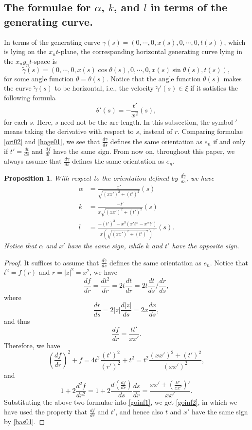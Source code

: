 \documentclass[12pt]{amsart}
\newtheorem{prop}[thm]{\sc Proposition}
\theoremstyle{definition}\newtheorem{exa}[thm]{\sc Example}
\theoremstyle{definition}\newtheorem{de}[thm]{\sc Definition}
\theoremstyle{definition}\newtheorem{rem}[thm]{\sc Remark}
\theoremstyle{definition}\newtheorem{prob}[thm]{\it Problem}
\theoremstyle{definition}\newtheorem{fact}[thm]{\sc Fact}
\theoremstyle{definition}\newtheorem{claim}[thm]{\sc Claim}
\numberwithin{equation}{section}
\begin{document}
\subsection{The formulae for $\alpha$, $k$, and $l$ in terms of the generating curve.}
In terms of the generating curve $\gamma(s)=(0,\cdots,0,x(s),0,\cdots,0,t(s))$, which is lying on the $x_{n}t$-plane, the corresponding horizontal generating curve lying in the $x_{n}y_{n}t$-space is
\begin{equation}\label{hoge01}
\tilde{\gamma}(s)=(0,\cdots,0,x(s)\cos{\theta(s)},0,\cdots,0,x(s)\sin{\theta(s)},t(s)),
\end{equation}
for some angle function $\theta=\theta(s)$. Notice that the angle function $\theta(s)$ makes the curve $\tilde{\gamma}(s)$ to be horizontal, i.e., the velocity $\tilde{\gamma}'(s)\in\xi$ if it satisfies the following formula 
\begin{equation}\label{foang}
\theta'(s)=-\frac{t'}{x^2}(s),
\end{equation}
for each $s$. Here, $s$ need not be the arc-length. In this subsection, the symbol $'$ means taking the derivative with respect to $s$, instead of $r$. Comparing formulae \eqref{ori02} and \eqref{hoge01}, we see that $\frac{d\tilde{\gamma}}{ds}$ defines the same orientation as $e_{n}$ if and only if $t'=\frac{dt}{ds}$ and $\frac{df}{dr}$ have the same sign. From now on, throughout this paper, we always assume that $\frac{d\tilde{\gamma}}{ds}$ defines the same orientation as $e_{n}$.
\begin{prop}
With respect to the orientation defined by
$\frac{d\tilde{\gamma}}{ds}$, we have
\begin{equation}\label{goinf2}
\begin{split}
\alpha&=\frac{x'}{\sqrt{(xx')^2+(t')^2}}(s)\\
k&=\frac{-t'}{x\sqrt{(xx')^2+(t')^2}}(s)\\  
l&=\frac{-(t')^3-x^3(x't''-x''t')}{x(\sqrt{(xx')^2+(t')^2})^3}(s).
\end{split}
\end{equation}
Notice that $\alpha$ and $x'$ have the same sign, while $k$ and $t'$ have the opposite sign.
\end{prop}
\begin{proof}
It suffices to assume that $\frac{d\tilde{\gamma}}{ds}$ defines the same orientation as $e_{n}$.
Notice that $t^{2}=f(r)$ and $ r=|z|^{2}=x^{2}$, we have 
\[\frac{df}{dr}=\frac{dt^2}{dr}=2t\frac{dt}{dr}=2t\frac{dt}{ds}/\frac{dr}{ds},\]
where \[\frac{dr}{ds}=2|z|\frac{d|z|}{ds}=2x\frac{dx}{ds},\] and thus 
\begin{equation}\label{bas01}
\frac{df}{dr}=\frac{tt'}{xx'}.
\end{equation}
Therefore, we have
\[(\frac{df}{dr})^2+f=4t^{2}\frac{(t')^2}{(r')^2}+t^2=t^{2}\frac{(xx')^2+(t')^2}{(xx')^2},\] and 
\[1+2\frac{d^2f}{dr^2}=1+2\frac{d(\frac{df}{dr})}{ds}\frac{ds}{dr}=\frac{xx'+(\frac{tt'}{xx'})'}{xx'}.\]
Substituting the above two formulae into \eqref{goinf1}, we get \eqref{goinf2}, in which we have used the property that $\frac{df}{dr}$ and $t'$, and hence also $t$ and $x'$  have the same sign by \eqref{bas01}.
\end{proof}
\end{document}
